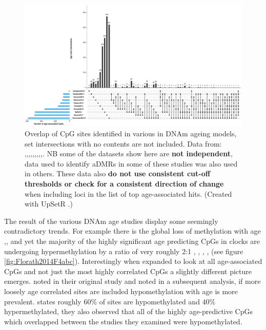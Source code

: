 \documentclass[]{book}
\begin{document}
\begin{figure}
\includegraphics[width=20in]{figs/AgeCpGUpSet} \caption{Overlap of CpG sites identified in various in DNAm ageing models, set intersections with no contents are not included.
Data from: \citep{Rakyan2010},\citep{Teschendorff2010},\citep{Bocklandt2011},\citep{Garagnani2012},\citep{Bell2012},\citep{Hannum2013},\citep{Horvath2013},\citep{Florath2014},\citep{Weidner2014},\citep{Benton2017}. NB some of the datasets show here are \textbf{not independent}, data used to identify aDMRs in some of these studies was also used in others. These data also \textbf{do not use consistent cut-off thresholds or check for a consistent direction of change} when including loci in the list of top age-associated hits.
(Created with UpSetR \citep{Lex2014}.)}\label{fig:AgeCpGUpSet}
\end{figure}





The result of the various DNAm age studies display some seemingly contradictory trends. For example there is the global loss of methylation with age \citep{Wilson1987},\citep{Fraga2005},\citep{Heyn2012} and yet the majority of the highly significant age predicting CpGs in clocks are undergoing hypermethylation by a ratio of very roughly 2:1 \citep{Rakyan2010}, \citep{Bocklandt2011}, \citep{Koch2011}, \citep{Garagnani2012}, \citep{Florath2014} (see figure \ref{fig:Florath2014F4abc}). Interestingly when expanded to look at all age-associated CpGs and not just the most highly correlated CpGs a slightly different picture emerges. \citet{Teschendorff2010} noted in their original study and \citet{Zhang2017} noted in a subsequent analysis, if more loosely age correlated sites are included hypomethylation with age is more prevalent. \citet{Zhang2017} states roughly 60\% of sites are hypomethylated and 40\% hypermethylated, they also observed that all of the highly age-predictive CpGs which overlapped between the studies they examined were hypomethylated.
\end{document}
